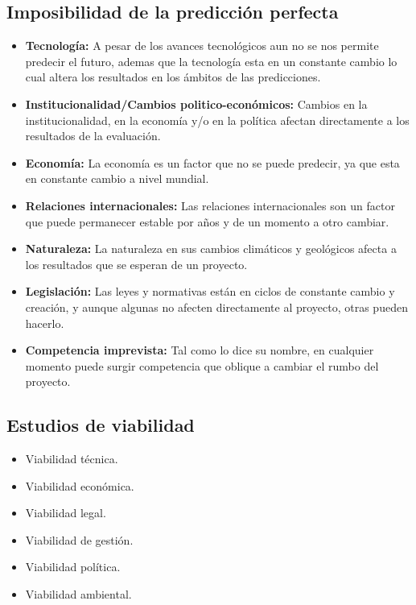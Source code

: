 \documentclass{templateNote}
\begin{document}
\subsection{Imposibilidad de la predicción perfecta}
\begin{itemize}
    \item \textbf{Tecnología:} A pesar de los avances tecnológicos aun no se nos permite predecir el futuro, ademas que la tecnología esta en un constante cambio lo cual altera los resultados en los ámbitos de las predicciones.
    \item \textbf{Institucionalidad/Cambios politico-económicos:} Cambios en la institucionalidad, en la economía y/o en la política afectan directamente a los resultados de la evaluación.
    \item \textbf{Economía:} La economía es un factor que no se puede predecir, ya que esta en constante cambio a nivel mundial.
    \item \textbf{Relaciones internacionales:} Las relaciones internacionales son un factor que puede permanecer estable por años y de un momento a otro cambiar.
    \item \textbf{Naturaleza:} La naturaleza en sus cambios climáticos y geológicos afecta a los resultados que se esperan de un proyecto.
    \item \textbf{Legislación:} Las leyes y normativas están en ciclos de constante cambio y creación, y aunque algunas no afecten directamente al proyecto, otras pueden hacerlo.
    \item \textbf{Competencia imprevista:} Tal como lo dice su nombre, en cualquier momento puede surgir competencia que oblique a cambiar el rumbo del proyecto.
\end{itemize}

\subsection{Estudios de viabilidad}
\begin{itemize}
    \item Viabilidad técnica.
    \item Viabilidad económica.
    \item Viabilidad legal.
    \item Viabilidad de gestión.
    \item Viabilidad política.
    \item Viabilidad ambiental.
\end{itemize}
\end{document}
